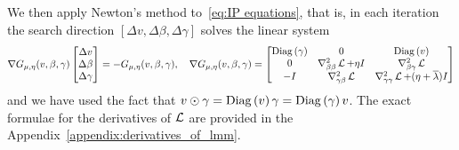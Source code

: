 We then apply Newton's method to~\eqref{eq:IP equations}, 
that is, in each iteration the search direction $[\Delta v, \Delta \beta, \Delta \gamma]$ solves the linear system
\[
	\nabla G_{\mu,\eta}(v, \beta, \gamma)\begin{bmatrix}
		\Delta v \\
		\Delta \beta \\
		\Delta \gamma
	\end{bmatrix} = -G_{\mu,\eta}(v, \beta, \gamma), \quad
	\nabla G_{\mu, \eta}(v, \beta, \gamma) = \begin{bmatrix}
 		\mathrm{Diag}\left(\gamma\right) & 0 & \mathrm{Diag}\left(v\right) \\
 		0 & \nabla^2_{\beta\beta}\operatorname{\mathcal{L}} + \eta I & \nabla^2_{\beta\gamma} \operatorname{\mathcal{L}}\\
 		-I & \nabla^2_{\gamma\beta}\operatorname{\mathcal{L}} & \nabla^2_{\gamma\gamma}\operatorname{\mathcal{L}} + (\eta + \overline{\lambda})	 I
 	\end{bmatrix}
\]
and we have used the fact that  $v\odot \gamma=\mathrm{Diag}\left(v\right)\gamma=\mathrm{Diag}\left(\gamma\right)v$. 
The exact formulae for the derivatives of $\operatorname{\mathcal{L}}$ are provided in the Appendix~\ref{appendix:derivatives_of_lmm}.

